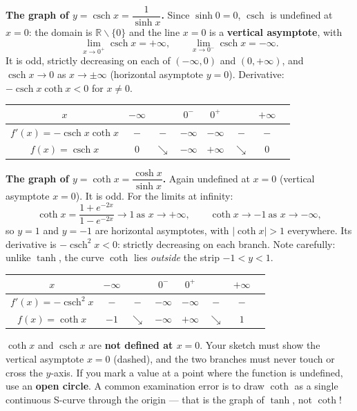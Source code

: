 \documentclass[11pt]{article}
\def\setminus{\mathbin{\backslash}}\let\smallsetminus\setminus
\begin{document}
\textbf{The graph of $y=\operatorname{csch} x = \dfrac{1}{\sinh x}$.} Since $\sinh 0 = 0$, $\operatorname{csch}$ is undefined at $x=0$: the domain is $\mathbb{R}\setminus\{0\}$ and the line $x=0$ is a \textbf{vertical asymptote}, with
\[
\lim_{x\to 0^+}\operatorname{csch} x = +\infty, \qquad \lim_{x\to 0^-}\operatorname{csch} x = -\infty.
\]
It is odd, strictly decreasing on each of $(-\infty,0)$ and $(0,+\infty)$, and $\operatorname{csch} x \to 0$ as $x\to\pm\infty$ (horizontal asymptote $y=0$). Derivative: $-\operatorname{csch} x \coth x < 0$ for $x \neq 0$.

\begin{center}
\begin{tabular}{|c|ccccccc|}
\hline
$x$ & $-\infty$ & & $0^-$ & $0^+$ & & $+\infty$ \\
\hline
$f'(x)=-\operatorname{csch} x \coth x$ & $-$ & $-$ & $-\infty$ & $-\infty$ & $-$ & $-$ \\
\hline
$f(x)=\operatorname{csch} x$ & $0$ & $\searrow$ & $-\infty$ & $+\infty$ & $\searrow$ & $0$ \\
\hline
\end{tabular}
\end{center}

\textbf{The graph of $y=\coth x = \dfrac{\cosh x}{\sinh x}$.} Again undefined at $x=0$ (vertical asymptote $x=0$). It is odd. For the limits at infinity:
\[
\coth x = \frac{1+e^{-2x}}{1-e^{-2x}} \to 1 \ \text{as } x\to+\infty, \qquad \coth x \to -1 \ \text{as } x\to-\infty,
\]
so $y=1$ and $y=-1$ are horizontal asymptotes, with $|\coth x|>1$ everywhere. Its derivative is $-\operatorname{csch}^2 x <0$: strictly decreasing on each branch. Note carefully: unlike $\tanh$, the curve $\coth$ lies \emph{outside} the strip $-1<y<1$.

\begin{center}
\begin{tabular}{|c|ccccccc|}
\hline
$x$ & $-\infty$ & & $0^-$ & $0^+$ & & $+\infty$ \\
\hline
$f'(x)=-\operatorname{csch}^2 x$ & $-$ & $-$ & $-\infty$ & $-\infty$ & $-$ & $-$ \\
\hline
$f(x)=\coth x$ & $-1$ & $\searrow$ & $-\infty$ & $+\infty$ & $\searrow$ & $1$ \\
\hline
\end{tabular}
\end{center}

\begin{attention}
$\coth x$ and $\operatorname{csch} x$ are \textbf{not defined at $x=0$}. Your sketch must show the vertical asymptote $x=0$ (dashed), and the two branches must never touch or cross the $y$-axis. If you mark a value at a point where the function is undefined, use an \textbf{open circle}. A common examination error is to draw $\coth$ as a single continuous S-curve through the origin --- that is the graph of $\tanh$, not $\coth$!
\end{attention}
\end{document}
